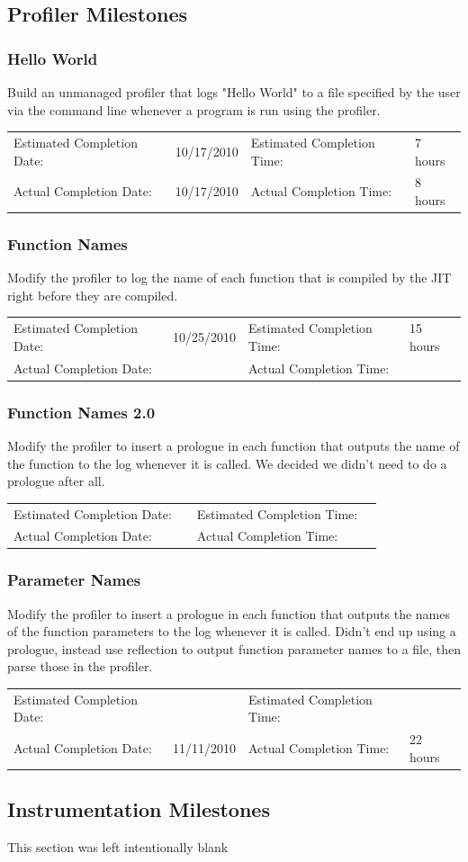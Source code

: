 \documentclass{article}
\newcommand{\timetbl}[4]{\par\vspace{5mm}\begin{tabular}{ l l l l }
Estimated Completion Date: & #1 & Estimated Completion Time: & #2 \\
Actual Completion Date: & #3 & Actual Completion Time: & #4 \\
\end{tabular}}
\begin{document}
\subsection{Profiler Milestones}

\subsubsection{Hello World}
Build an unmanaged profiler that logs "Hello World" to a file specified by the user via the command line whenever a program is run using the profiler.

\timetbl{10/17/2010}{7 hours}{10/17/2010}{8 hours}

\subsubsection{Function Names}
Modify the profiler to log the name of each function that is compiled by the JIT right before they are compiled.

\timetbl{10/25/2010}{15 hours}{}{}

\subsubsection{Function Names 2.0}
Modify the profiler to insert a prologue in each function that outputs the name of the function to the log whenever it is called.
We decided we didn't need to do a prologue after all.
\timetbl{}{}{}{}

\subsubsection{Parameter Names}
Modify the profiler to insert a prologue in each function that outputs the names of the function parameters to the log whenever it is called.
Didn't end up using a prologue, instead use reflection to output function parameter names to a file, then parse those in the profiler.
\timetbl{}{}{11/11/2010}{22 hours}

\subsection{Instrumentation Milestones}

This section was left intentionally blank



\end{document}
